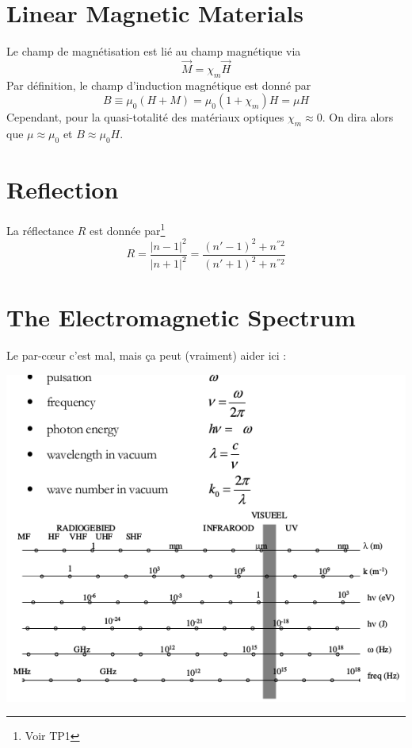 \newpage
\section{Linear Magnetic Materials}
Le champ de magnétisation est lié au champ magnétique via
\begin{equation}
\vec M = \chi_m\vec{H}
\end{equation}
Par définition, le champ d'induction magnétique est donné par
\begin{equation}
B \equiv \mu_0(H+M) = \mu_0(1+\chi_m)H=\mu H
\end{equation}
Cependant, pour la quasi-totalité des matériaux optiques $\chi_m\approx0$. On dira alors que $\mu\approx
\mu_0$ et $B \approx \mu_0H$.

\section{Reflection}
La réflectance $R$ est donnée par\footnote{Voir TP1}
\begin{equation}
R = \dfrac{|n-1|^2}{|n+1|^2} = \dfrac{(n'-1)^2+n^{''2}}{(n'+1)^2+n^{''2}}
\end{equation}

\section{The Electromagnetic Spectrum}
Le par-cœur c'est mal, mais ça peut (vraiment) aider ici :
\begin{center}
\includegraphics[scale=0.65]{ch2/image3}
\end{center}
